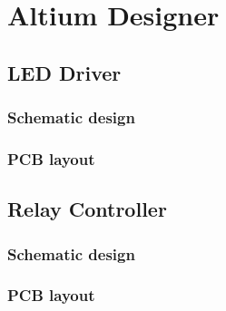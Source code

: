 \section{Altium Designer}
\subsection{LED Driver}
\subsubsection{Schematic design}
\subsubsection{PCB layout}
\subsection{Relay Controller}
\subsubsection{Schematic design}
\subsubsection{PCB layout}
